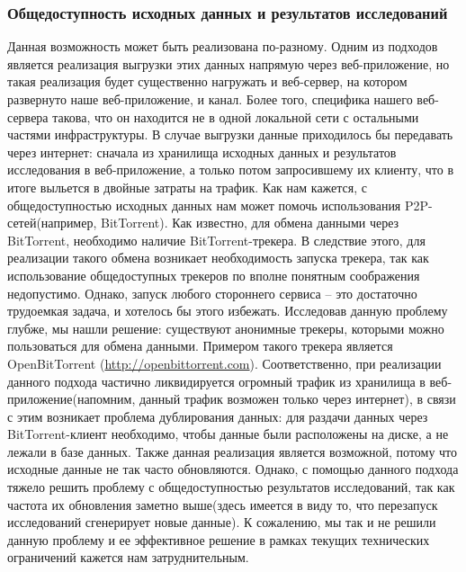 \documentclass[12pt,a4paper]{extarticle}
\begin{document}
\subsubsection{Общедоступность исходных данных и результатов исследований}
Данная возможность может быть реализована по-разному. Одним из подходов является реализация выгрузки этих данных напрямую через веб-приложение, но такая реализация будет существенно нагружать и веб-сервер, на котором развернуто наше веб-приложение, и канал. Более того, специфика нашего веб-сервера такова, что он находится не в одной локальной сети с остальными частями инфраструктуры. В случае выгрузки данные приходилось бы передавать через интернет: сначала из хранилища исходных данных и результатов исследования в веб-приложение, а только потом запросившему их клиенту, что в итоге выльется в двойные затраты на трафик. Как нам кажется, с общедоступностью исходных данных нам может помочь использования P2P-сетей(например, BitTorrent). Как известно, для обмена данными через BitTorrent, необходимо наличие BitTorrent-трекера. В следствие этого, для реализации такого обмена возникает необходимость запуска трекера, так как использование общедоступных трекеров по вполне понятным соображения недопустимо. Однако, запуск любого стороннего сервиса -- это достаточно трудоемкая задача, и хотелось бы этого избежать. Исследовав данную проблему глубже, мы нашли решение: существуют анонимные трекеры, которыми можно пользоваться для обмена данными. Примером такого трекера является OpenBitTorrent (\url{http://openbittorrent.com}). Соответственно, при реализации данного подхода частично ликвидируется огромный трафик из хранилища в веб-приложение(напомним, данный трафик возможен только через интернет), в связи с этим возникает проблема дублирования данных: для раздачи данных через BitTorrent-клиент необходимо, чтобы данные были расположены на диске, а не лежали в базе данных. Также данная реализация является возможной, потому что исходные данные не так часто обновляются. Однако, с помощью данного подхода тяжело решить проблему с общедоступностью результатов исследований, так как частота их обновления заметно выше(здесь имеется в виду то, что перезапуск исследований сгенерирует новые данные). К сожалению, мы так и не решили данную проблему и ее эффективное решение в рамках текущих технических ограничений кажется нам затруднительным.
\end{document}
